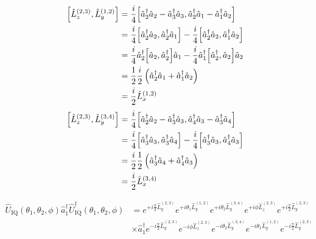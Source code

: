 \begin{equation}
	\begin{split}
		\comm{\hat{L}_z^{(2,3)}}{\hat{L}_y^{(1,2)}}
		&=
		\frac{i}{4}
		\comm{
			\hat{a}_2^\dagger
			\hat{a}_2
			-
			\hat{a}_3^\dagger
			\hat{a}_3
		}{
			\hat{a}_2^\dagger
			\hat{a}_1
			-
			\hat{a}_1^\dagger
			\hat{a}_2
		}
		\\
		&=
		\frac{i}{4}
		\comm{
			\hat{a}_2^\dagger
			\hat{a}_2
		}{
			\hat{a}_2^\dagger
			\hat{a}_1
		}
		-
		\frac{i}{4}
		\comm{
			\hat{a}_2^\dagger
			\hat{a}_2
		}{
			\hat{a}_1^\dagger
			\hat{a}_2
		}
		\\
		&=
		\frac{i}{4}
		\hat{a}_2^\dagger
		\comm{\hat{a}_2}{\hat{a}_2^\dagger}
		\hat{a}_1
		-
		\frac{i}{4}
		\hat{a}_1^\dagger
		\comm{\hat{a}_2^\dagger}{\hat{a}_2}
		\hat{a}_2
		\\
		&=
		\frac{1}{2}
		\frac{i}{2}
		\left(
			\hat{a}_2^\dagger
			\hat{a}_1
			+
			\hat{a}_1^\dagger
			\hat{a}_2
		\right)
		\\
		&=
		\frac{i}{2}\hat{L}_x^{(1,2)}
	\end{split}
\end{equation}
\begin{equation}
	\begin{split}
		\comm{\hat{L}_z^{(2,3)}}{\hat{L}_y^{(3,4)}}
		&=
		\frac{i}{4}
		\comm{
			\hat{a}_2^\dagger
			\hat{a}_2
			-
			\hat{a}_3^\dagger
			\hat{a}_3
		}{
			\hat{a}_4^\dagger
			\hat{a}_3
			-
			\hat{a}_3^\dagger
			\hat{a}_4		
		}
		\\
		&=
		\frac{i}{4}
		\comm{
			\hat{a}_3^\dagger
			\hat{a}_3
		}{
			\hat{a}_3^\dagger
			\hat{a}_4		
		}
		-
		\frac{i}{4}
		\comm{
			\hat{a}_3^\dagger
			\hat{a}_3
		}{
			\hat{a}_4^\dagger
			\hat{a}_3
		}
		\\
		&=
		\frac{i}{2}
		\frac{1}{2}
		\left(
			\hat{a}_3^\dagger
			\hat{a}_4
			+
			\hat{a}_4^\dagger
			\hat{a}_3
		\right)
		\\
		&=
		\frac{i}{2}
		\hat{L}_x^{(3,4)}
	\end{split}
\end{equation}

\begin{equation}
	\begin{split}
		\hat{U}_\text{IQ}(\theta_1,\theta_2,\phi)
		\hat{a}_1^\dagger
		\hat{U}_\text{IQ}^\dagger(\theta_1,\theta_2,\phi)
		&=
		e^{+i\frac{\pi}{2}\hat{L}_y^{(2,3)}}
		e^{+i\theta_1\hat{L}_y^{(1,2)}}
		e^{+i\theta_2\hat{L}_y^{(3,4)}}
		e^{+i\phi\hat{L}_z^{(2,3)}}
		e^{+i\frac{\pi}{2}\hat{L}_y^{(2,3)}}
		\\
		&\times
		\hat{a}_1^\dagger
		e^{-i\frac{\pi}{2}\hat{L}_y^{(2,3)}}
		e^{-i\phi\hat{L}_z^{(2,3)}}
		e^{-i\theta_2\hat{L}_y^{(3,4)}}
		e^{-i\theta_1\hat{L}_y^{(1,2)}}
		e^{-i\frac{\pi}{2}\hat{L}_y^{(2,3)}}
	\end{split}
\end{equation}

